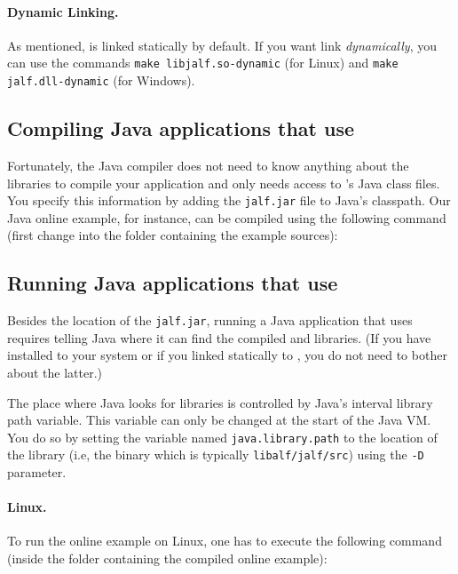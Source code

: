 \paragraph{Dynamic Linking.}
As mentioned, \libalf is linked statically by default. If you want link \libalf \emph{dynamically}, you can use the commands \texttt{make libjalf.so-dynamic} (for Linux) and \texttt{make jalf.dll-dynamic} (for Windows).

\subsection{Compiling Java applications that use \jalf}
Fortunately, the Java compiler does not need to know anything about the \cpp libraries to compile your application and only needs access to \jalf's Java class files. You specify this information by adding the \texttt{jalf.jar} file to Java's classpath. Our Java online example, for instance, can be compiled using the following command (first change into the folder containing the example sources):


\subsection{Running Java applications that use \jalf}
Besides the location of the \texttt{jalf.jar}, running a Java application that uses \jalf requires telling Java where it can find the compiled \jalf and \libalf \cpp libraries. (If you have installed \libalf to your system or if you linked \jalf statically to \jalf, you do not need to bother about the latter.)

The place where Java looks for \cpp libraries is controlled by Java's interval library path variable. This variable can only be changed at the start of the Java VM. You do so by setting the variable named \texttt{java.library.path} to the location of the \jalf library (i.e, the \jalf \cpp binary which is typically \texttt{libalf/jalf/src}) using the \texttt{-D} parameter. 

\paragraph{Linux.}
To run the online example on Linux, one has to execute the following command (inside the folder containing the compiled online example):


